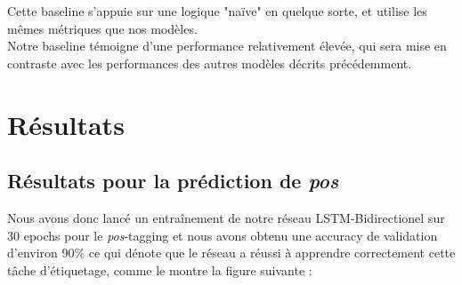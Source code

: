 \documentclass[a4paper]{article}
\begin{document}
Cette baseline s'appuie sur une logique "naïve" en quelque sorte, et utilise les mêmes métriques que nos modèles. \\

Notre baseline témoigne d'une performance relativement élevée, qui sera mise en contraste avec les performances des autres modèles décrits précédemment. 

\section{Résultats}

\subsection{Résultats pour la prédiction de \textit{pos}}
Nous avons donc lancé un entraînement de notre réseau LSTM-Bidirectionel sur 30 epochs pour le \textit{pos}-tagging et 
nous avons obtenu une accuracy de validation d'environ 90\% ce qui dénote que le réseau a réussi à apprendre 
correctement cette tâche d'étiquetage, comme le montre la figure suivante :
\end{document}
